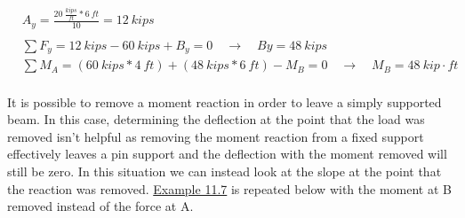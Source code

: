 \documentclass[
  letterpaper,
  DIV=11,
  numbers=noendperiod]{scrreprt}
\theoremstyle{definition}
\theoremstyle{remark}
\begin{document}
\begin{tcolorbox}
\begin{tcolorbox}
\[
\begin{aligned}
&A_y=\frac{20~\frac{kips}{ft}*6{~ft}}{10}=12{~kips} \\
\\
& \sum F_y=12{~kips}-60{~kips}+B_y=0 \quad \rightarrow \quad B y=48{~kips} \\
& \sum M_A=(60{~kips}* 4{~ft})+(48{~kips}*6{~ft})-M_B=0 \quad \rightarrow \quad M_B=48{~kip}\cdot{ft} \\
& \end{aligned}
\]

\end{tcolorbox}

\end{tcolorbox}

It is possible to remove a moment reaction in order to leave a simply
supported beam. In this case, determining the deflection at the point
that the load was removed isn't helpful as removing the moment reaction
from a fixed support effectively leaves a pin support and the deflection
with the moment removed will still be zero. In this situation we can
instead look at the slope at the point that the reaction was removed.
\hyperref[example-11.7b]{Example 11.7} is repeated below with the moment
at B removed instead of the force at A.
\end{document}
